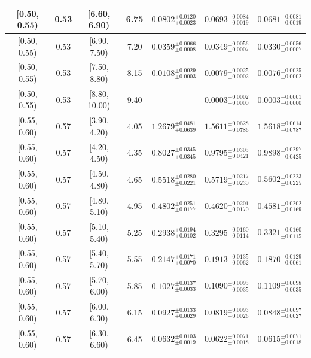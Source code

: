 \begin{longtable}{|c|c|c|c|c|c|c|}
\hline
[0.50, 0.55) & 0.53 & [6.60, 6.90) & 6.75 & $0.0802^{ \pm 0.0120 }_{ \pm 0.0023 }$ & $0.0693^{ \pm 0.0084 }_{ \pm 0.0019 }$ & $0.0681^{ \pm 0.0081 }_{ \pm 0.0019 }$ \\ 
\hline
[0.50, 0.55) & 0.53 & [6.90, 7.50) & 7.20 & $0.0359^{ \pm 0.0066 }_{ \pm 0.0008 }$ & $0.0349^{ \pm 0.0056 }_{ \pm 0.0007 }$ & $0.0330^{ \pm 0.0056 }_{ \pm 0.0007 }$ \\ 
\hline
[0.50, 0.55) & 0.53 & [7.50, 8.80) & 8.15 & $0.0108^{ \pm 0.0029 }_{ \pm 0.0003 }$ & $0.0079^{ \pm 0.0025 }_{ \pm 0.0002 }$ & $0.0076^{ \pm 0.0025 }_{ \pm 0.0002 }$ \\ 
\hline
[0.50, 0.55) & 0.53 & [8.80, 10.00) & 9.40 & - & $0.0003^{ \pm 0.0002 }_{ \pm 0.0000 }$ & $0.0003^{ \pm 0.0001 }_{ \pm 0.0000 }$ \\ 
\hline
[0.55, 0.60) & 0.57 & [3.90, 4.20) & 4.05 & $1.2679^{ \pm 0.0481 }_{ \pm 0.0639 }$ & $1.5611^{ \pm 0.0628 }_{ \pm 0.0786 }$ & $1.5618^{ \pm 0.0614 }_{ \pm 0.0787 }$ \\ 
\hline
[0.55, 0.60) & 0.57 & [4.20, 4.50) & 4.35 & $0.8027^{ \pm 0.0345 }_{ \pm 0.0345 }$ & $0.9795^{ \pm 0.0305 }_{ \pm 0.0421 }$ & $0.9898^{ \pm 0.0297 }_{ \pm 0.0425 }$ \\ 
\hline
[0.55, 0.60) & 0.57 & [4.50, 4.80) & 4.65 & $0.5518^{ \pm 0.0280 }_{ \pm 0.0221 }$ & $0.5719^{ \pm 0.0217 }_{ \pm 0.0230 }$ & $0.5602^{ \pm 0.0223 }_{ \pm 0.0225 }$ \\ 
\hline
[0.55, 0.60) & 0.57 & [4.80, 5.10) & 4.95 & $0.4802^{ \pm 0.0251 }_{ \pm 0.0177 }$ & $0.4620^{ \pm 0.0201 }_{ \pm 0.0170 }$ & $0.4581^{ \pm 0.0202 }_{ \pm 0.0169 }$ \\ 
\hline
[0.55, 0.60) & 0.57 & [5.10, 5.40) & 5.25 & $0.2938^{ \pm 0.0194 }_{ \pm 0.0102 }$ & $0.3295^{ \pm 0.0160 }_{ \pm 0.0114 }$ & $0.3321^{ \pm 0.0160 }_{ \pm 0.0115 }$ \\ 
\hline
[0.55, 0.60) & 0.57 & [5.40, 5.70) & 5.55 & $0.2147^{ \pm 0.0171 }_{ \pm 0.0070 }$ & $0.1913^{ \pm 0.0135 }_{ \pm 0.0062 }$ & $0.1870^{ \pm 0.0129 }_{ \pm 0.0061 }$ \\ 
\hline
[0.55, 0.60) & 0.57 & [5.70, 6.00) & 5.85 & $0.1027^{ \pm 0.0137 }_{ \pm 0.0033 }$ & $0.1090^{ \pm 0.0095 }_{ \pm 0.0035 }$ & $0.1109^{ \pm 0.0098 }_{ \pm 0.0035 }$ \\ 
\hline
[0.55, 0.60) & 0.57 & [6.00, 6.30) & 6.15 & $0.0927^{ \pm 0.0133 }_{ \pm 0.0029 }$ & $0.0819^{ \pm 0.0093 }_{ \pm 0.0026 }$ & $0.0848^{ \pm 0.0097 }_{ \pm 0.0027 }$ \\ 
\hline
[0.55, 0.60) & 0.57 & [6.30, 6.60) & 6.45 & $0.0632^{ \pm 0.0103 }_{ \pm 0.0019 }$ & $0.0622^{ \pm 0.0071 }_{ \pm 0.0018 }$ & $0.0615^{ \pm 0.0071 }_{ \pm 0.0018 }$ \\ 

\end{longtable}
